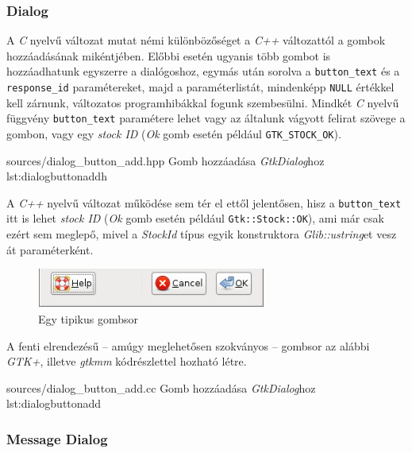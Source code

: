\subsubsection{Dialog}
\label{sec:dialogbuttonadd}

A \textit{C} nyelvű változat mutat némi különbözőséget a \textit{C++} változattól a gombok hozzáadásának mikéntjében. Előbbi esetén ugyanis több gombot is hozzáadhatunk egyszerre a dialógoshoz, egymás után sorolva a \texttt{button\_text} és a \texttt{response\_id} paramétereket, majd a paraméterlistát, mindenképp \texttt{NULL} értékkel kell zárnunk, változatos programhibákkal fogunk szembesülni. Mindkét \textit{C} nyelvű függvény \texttt{button\_text} paramétere lehet vagy az általunk vágyott felirat szövege a gombon, vagy egy \textit{stock ID} (\textit{Ok} gomb esetén például \texttt{GTK\_STOCK\_OK}).

{sources/dialog_button_add.hpp}
{Gomb hozzáadása \textit{GtkDialog}hoz}
{lst:dialogbuttonaddh}

A \textit{C++} nyelvű változat működése sem tér el ettől jelentősen, hisz a \texttt{button\_text} itt is lehet \textit{stock ID} (\textit{Ok} gomb esetén például \texttt{Gtk::Stock::OK}), ami már csak ezért sem meglepő, mivel a \textit{StockId} típus egyik konstruktora \textit{Glib::ustring}et vesz át paraméterként.

\begin{figure}[H]
\begin{center}
\includegraphics[height=13mm]{images/button-alternate.png}
\caption{Egy tipikus gombsor}
\end{center}
\end{figure}

A fenti elrendezésű -- amúgy meglehetősen szokványos -- gombsor az alábbi \textit{GTK+}, illetve \textit{gtkmm} kódrészlettel hozható létre.

{sources/dialog_button_add.cc}
{Gomb hozzáadása \textit{GtkDialog}hoz}
{lst:dialogbuttonadd}

\subsubsection{Message Dialog}
\label{sec:messagedialog}

